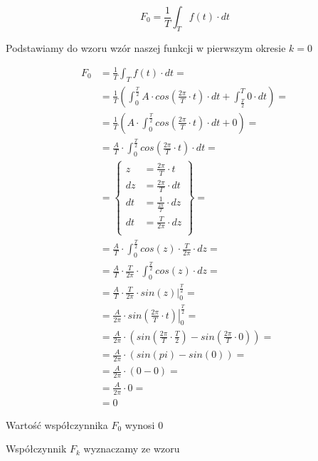 \begin{task}
\begin{equation}
F_0=\frac{1}{T}\int_{T}f(t) \cdot dt
\end{equation}

Podstawiamy do wzoru wzór naszej funkcji w pierwszym okresie $k=0$

\begin{align*}
F_0&=\frac{1}{T}\int_{T}f(t) \cdot dt=\\
&=\frac{1}{T}\left(\int_{0}^{\frac{T}{2}} A \cdot cos\left( \frac{2\pi}{T} \cdot t\right) \cdot dt + \int_{\frac{T}{2}}^{T} 0 \cdot dt\right)=\\
&=\frac{1}{T}\left(A \cdot \int_{0}^{\frac{T}{2}} cos\left( \frac{2\pi}{T} \cdot t\right) \cdot dt + 0\right)=\\
&=\frac{A}{T} \cdot \int_{0}^{\frac{T}{2}} cos\left( \frac{2\pi}{T} \cdot t\right) \cdot dt =\\
&=\begin{Bmatrix}
z&=\frac{2\pi}{T} \cdot t\\
dz&=\frac{2\pi}{T} \cdot dt\\
dt&=\frac{1}{\frac{2\pi}{T}} \cdot dz\\
dt&=\frac{T}{2\pi} \cdot dz\\
\end{Bmatrix}=\\
&=\frac{A}{T} \cdot \int_{0}^{\frac{T}{2}} cos\left(z\right) \cdot \frac{T}{2\pi} \cdot dz =\\
&=\frac{A}{T} \cdot \frac{T}{2\pi} \cdot \int_{0}^{\frac{T}{2}} cos\left(z\right)  \cdot dz =\\
&=\frac{A}{T} \cdot \frac{T}{2\pi} \cdot \left. sin\left(z\right)  \right|_{0}^{\frac{T}{2}} =\\
&=\frac{A}{2\pi} \cdot \left. sin\left(\frac{2\pi}{T} \cdot t\right)  \right|_{0}^{\frac{T}{2}} =\\
&=\frac{A}{2\pi} \cdot \left( sin\left(\frac{2\pi}{T} \cdot \frac{T}{2}\right) - sin\left(\frac{2\pi}{T} \cdot 0\right) \right) =\\
&=\frac{A}{2\pi} \cdot \left( sin\left(pi\right) - sin\left(0\right) \right) =\\
&=\frac{A}{2\pi} \cdot \left( 0 -0 \right) =\\
&=\frac{A}{2\pi} \cdot 0 =\\
&=0 
\end{align*}

Wartość współczynnika $F_0$ wynosi $0$

Współczynnik $F_k$ wyznaczamy ze wzoru


\end{task}
